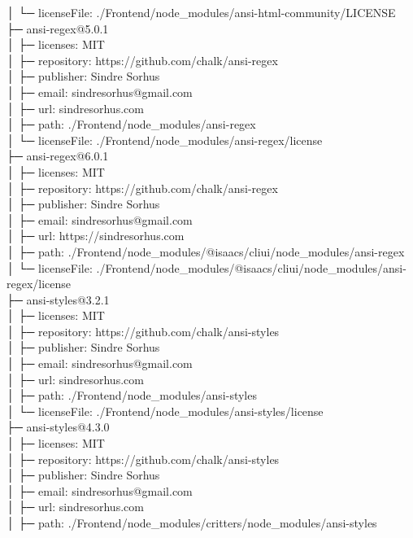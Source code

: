 │  └─ licenseFile: ./Frontend/node\_modules/ansi-html-community/LICENSE\\
├─ ansi-regex@5.0.1\\
│  ├─ licenses: MIT\\
│  ├─ repository: https://github.com/chalk/ansi-regex\\
│  ├─ publisher: Sindre Sorhus\\
│  ├─ email: sindresorhus@gmail.com\\
│  ├─ url: sindresorhus.com\\
│  ├─ path: ./Frontend/node\_modules/ansi-regex\\
│  └─ licenseFile: ./Frontend/node\_modules/ansi-regex/license\\
├─ ansi-regex@6.0.1\\
│  ├─ licenses: MIT\\
│  ├─ repository: https://github.com/chalk/ansi-regex\\
│  ├─ publisher: Sindre Sorhus\\
│  ├─ email: sindresorhus@gmail.com\\
│  ├─ url: https://sindresorhus.com\\
│  ├─ path: ./Frontend/node\_modules/@isaacs/cliui/node\_modules/ansi-regex\\
│  └─ licenseFile: ./Frontend/node\_modules/@isaacs/cliui/node\_modules/ansi-regex/license\\
├─ ansi-styles@3.2.1\\
│  ├─ licenses: MIT\\
│  ├─ repository: https://github.com/chalk/ansi-styles\\
│  ├─ publisher: Sindre Sorhus\\
│  ├─ email: sindresorhus@gmail.com\\
│  ├─ url: sindresorhus.com\\
│  ├─ path: ./Frontend/node\_modules/ansi-styles\\
│  └─ licenseFile: ./Frontend/node\_modules/ansi-styles/license\\
├─ ansi-styles@4.3.0\\
│  ├─ licenses: MIT\\
│  ├─ repository: https://github.com/chalk/ansi-styles\\
│  ├─ publisher: Sindre Sorhus\\
│  ├─ email: sindresorhus@gmail.com\\
│  ├─ url: sindresorhus.com\\
│  ├─ path: ./Frontend/node\_modules/critters/node\_modules/ansi-styles\\
